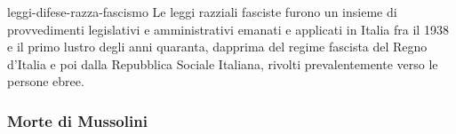\documentclass[preview]{standalone}
\begin{document}
\begin{snippet}{leggi-difese-razza-fascismo}
    Le leggi razziali fasciste furono un insieme di provvedimenti legislativi e amministrativi
    emanati e applicati in Italia fra il 1938 e il primo lustro degli anni quaranta,
    dapprima del regime fascista del Regno d'Italia e poi dalla Repubblica Sociale Italiana,
    rivolti prevalentemente verso le persone ebree.
\end{snippet}

\subsubsection{Morte di Mussolini}


\end{document}
